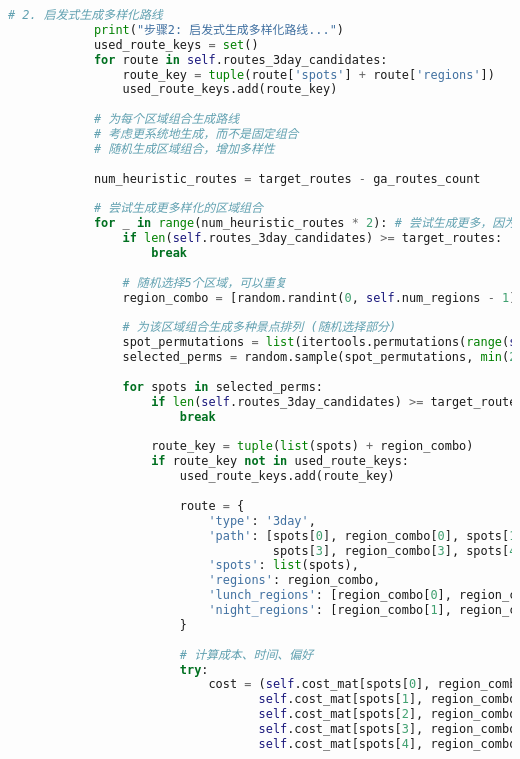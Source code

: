 \begin{lstlisting}[language=Python]
            # 2. 启发式生成多样化路线
            print("步骤2: 启发式生成多样化路线...")
            used_route_keys = set()
            for route in self.routes_3day_candidates:
                route_key = tuple(route['spots'] + route['regions'])
                used_route_keys.add(route_key)
            
            # 为每个区域组合生成路线
            # 考虑更系统地生成，而不是固定组合
            # 随机生成区域组合，增加多样性
            
            num_heuristic_routes = target_routes - ga_routes_count
            
            # 尝试生成更多样化的区域组合
            for _ in range(num_heuristic_routes * 2): # 尝试生成更多，因为会有重复或无效
                if len(self.routes_3day_candidates) >= target_routes:
                    break
                
                # 随机选择5个区域，可以重复
                region_combo = [random.randint(0, self.num_regions - 1) for _ in range(5)]
                
                # 为该区域组合生成多种景点排列 (随机选择部分)
                spot_permutations = list(itertools.permutations(range(self.num_spots)))
                selected_perms = random.sample(spot_permutations, min(2, len(spot_permutations))) # 减少每个区域组合的景点排列数
                
                for spots in selected_perms:
                    if len(self.routes_3day_candidates) >= target_routes:
                        break
                        
                    route_key = tuple(list(spots) + region_combo)
                    if route_key not in used_route_keys:
                        used_route_keys.add(route_key)
                        
                        route = {
                            'type': '3day',
                            'path': [spots[0], region_combo[0], spots[1], region_combo[1], spots[2], region_combo[2], 
                                     spots[3], region_combo[3], spots[4], region_combo[4], spots[5]],
                            'spots': list(spots),
                            'regions': region_combo,
                            'lunch_regions': [region_combo[0], region_combo[2], region_combo[4]],
                            'night_regions': [region_combo[1], region_combo[3]],
                        }
                        
                        # 计算成本、时间、偏好
                        try:
                            cost = (self.cost_mat[spots[0], region_combo[0]] + self.cost_mat[spots[1], region_combo[0]] +
                                   self.cost_mat[spots[1], region_combo[1]] + self.cost_mat[spots[2], region_combo[1]] +
                                   self.cost_mat[spots[2], region_combo[2]] + self.cost_mat[spots[3], region_combo[2]] +
                                   self.cost_mat[spots[3], region_combo[3]] + self.cost_mat[spots[4], region_combo[3]] +
                                   self.cost_mat[spots[4], region_combo[4]] + self.cost_mat[spots[5], region_combo[4]])
                            

\end{lstlisting}
